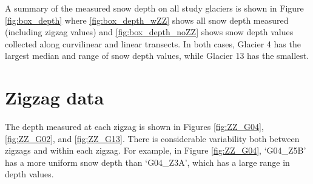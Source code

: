 \documentclass[12pt]{article}
\begin{document}
A summary of the measured snow depth on all study glaciers is shown in Figure \ref{fig:box_depth} where \ref{fig:box_depth_wZZ} shows all snow depth measured (including zigzag values) and \ref{fig:box_depth_noZZ} shows snow depth values collected along curvilinear and linear transects. In both cases, Glacier 4 has the largest median and range of snow depth values, while Glacier 13 has the smallest. 

\section{Zigzag data}

The depth measured at each zigzag is shown in Figures \ref{fig:ZZ_G04}, \ref{fig:ZZ_G02}, and \ref{fig:ZZ_G13}. There is considerable variability both between zigzags and within each zigzag. For example, in Figure \ref{fig:ZZ_G04}, `G04\_Z5B' has a more uniform snow depth than `G04\_Z3A', which has a large range in depth values. 
\end{document}
